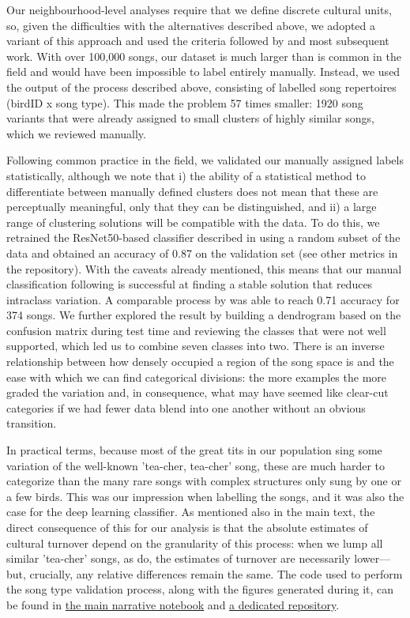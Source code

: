 \documentclass[9pt, twocolumn, twoside]{gsajnl}
\begin{document}
Our neighbourhood-level analyses require that we define discrete cultural units, so, given the difficulties with the alternatives described above, we adopted a variant of this approach and used the criteria followed by \textcite{mcgregor1982b} and most subsequent work. With over 100,000 songs, our dataset is much larger than is common in the field and would have been impossible to label entirely manually. Instead, we used the output of the process described above, consisting of labelled song repertoires (birdID x song type). This made the problem 57 times smaller: 1920 song variants that were already assigned to small clusters of highly similar songs, which we reviewed manually.

Following common practice in the field, we validated our manually assigned labels statistically, although we note that i) the ability of a statistical method to differentiate between manually defined clusters does not mean that these are perceptually meaningful, only that they can be distinguished, and ii) a large range of clustering solutions will be compatible with the data. To do this, we retrained the ResNet50-based classifier described in \textcite{merinorecalde2023} using a random subset of the data and obtained an accuracy of 0.87 on the validation set (see other metrics in the repository). With the caveats already mentioned, this means that our manual classification following \textcite{mcgregor1982b} is successful at finding a stable solution that reduces intraclass variation. A comparable process by \textcite{fayet2014} was able to reach 0.71 accuracy for 374 songs. We further explored the result by building a dendrogram based on the confusion matrix during test time and reviewing the classes that were not well supported, which led us to combine seven classes into two. There is an inverse relationship between how densely occupied a region of the song space is and the ease with which we can find categorical divisions: the more examples the more graded the variation and, in consequence, what may have seemed like clear-cut categories if we had fewer data blend into one another without an obvious transition.

In practical terms, because most of the great tits in our population sing some variation of the well-known 'tea-cher, tea-cher' song, these are much harder to categorize than the many rare songs with complex structures only sung by one or a few birds. This was our impression when labelling the songs, and it was also the case for the deep learning classifier. As mentioned also in the main text, the direct consequence of this for our analysis is that the absolute estimates of cultural turnover depend on the granularity of this process: when we lump all similar 'tea-cher' songs, as \textcite{mcgregor1982b} do, the estimates of turnover are necessarily lower---but, crucially, any relative differences remain the same.
The code used to perform the song type validation process, along with the figures generated during it, can be found in \href{https://github.com/nilomr/wytham-songtype-validation/blob/main/notebooks/4_train-model.ipynb}{the main narrative notebook} and \href{https://github.com/nilomr/wytham-songtype-validation}{a dedicated repository}.
\end{document}
